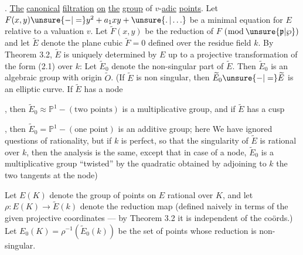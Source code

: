 \begingroup
\makeatletter\tagsleft@true{}. \uline{The} \uline{canonical} \uline{filtration} \uline{on} \uline{the} \uline{group} of $v$-\uline{adic} \uline{points}. Let $F(x,y)\unsure{-|=}y^2+a_1xy+\unsure{\ldotp|\ldots}$ be a minimal equation for $E$ relative to a valuation $v$. Let $\widetilde F(x,y)$ be the reduction of $F$ $(\bmod\,\unsure{\mathfrak{p}|\wp})$ and let $\widetilde E$ denote the plane cubic $\widetilde F=0$ defined over the residue field $k$. By Theorem 3.2, $\widetilde E$ is uniquely determined by $E$ up to a projective transformation of the form (2.1) over $k$: Let $\widetilde E_0$ denote the non-singular part of $\widetilde E$. Then $\widetilde E_0$ is an algebraic group with origin $\widetilde O$. (If $\widetilde E$ is non singular, then $\widetilde E_0\unsure{-|=}\widetilde E$ is an elliptic curve. If $\widetilde E$ has a node
\parbox[c]{1.4em}{\setlength{\topsep}{0pt}}, then $\widetilde E_0\approx\mathbb{P}^1-(\text{two points})$ is a multiplicative group, and if $\widetilde E$ has a cusp
\parbox[c]{1.4em}{\setlength{\topsep}{0pt}}, then $\widetilde E_0=\mathbb{P}^1-(\text{one point})$ is an additive group; here We have ignored questions of rationality, but if $k$ is perfect, so that the singularity of $\widetilde E$ is rational over $k$, then the analysis is the same, except that in case of a node, $\widetilde E_0$ is a multiplicative group ``twisted'' by the quadratic  obtained by adjoining to $k$ the two tangents at the node)

Let $E(K)$ denote the group of points on $E$ rational over $K$, and let $\rho:E(K)\longrightarrow\widetilde E(k)$ denote the reduction map (defined naively in terms of the given projective coordinates --- by Theorem 3.2 it is independent of the coörds.) Let $E_0(K)=\rho^{-1}(\widetilde E_0(k))$ be the set of points whose reduction is non-singular.

